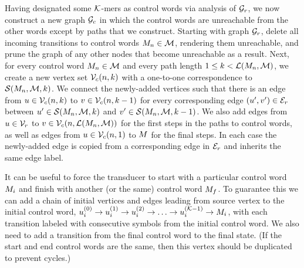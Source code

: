 \documentclass[english]{article}
\begin{document}
Having designated some ${\cal K}$-mers as control words via analysis of ${\cal G}_r$,
we now construct a new graph ${\cal G}_c$
in which the control words are unreachable from the other words
except by paths that we construct.
Starting with graph ${\cal G}_r$, delete all incoming transitions to control words $M_n \in {\cal M}$,
rendering them unreachable,
and prune the graph of any other nodes that become unreachable as a result.
Next, for every control word $M_n \in {\cal M}$
and every path length $1 \leq k < {\cal L}(M_n,{\cal M})$,
we create a new vertex set ${\cal V}_c(n,k)$
with a one-to-one correspondence to ${\cal S}(M_n,{\cal M},k)$.
We connect the newly-added vertices such that there is an edge from
$u \in {\cal V}_c(n,k)$ to $v \in {\cal V}_c(n,k-1)$
for every corresponding edge $(u',v') \in {\cal E}_r$ between
$u' \in {\cal S}(M_n,{\cal M},k)$
and
$v' \in {\cal S}(M_n,{\cal M},k-1)$.
We also add edges from
$u \in {\cal V}_r$ to $v \in {\cal V}_c(n,{\cal L}(M_n,{\cal M}))$
for the first steps in the paths to control words,
as well as edges from
$u \in {\cal V}_c(n,1)$ to $M$
for the final steps.
In each case the newly-added edge is copied from a corresponding edge in ${\cal E}_r$
and inherits the same edge label.

It can be useful to force the transducer to start with a particular control word $M_i$
and finish with another (or the same) control word $M_f$.
To guarantee this we can add a chain of initial vertices and edges leading from source vertex to the initial control word,
$u^{(0)}_i \to u^{(1)}_i \to u^{(2)}_i \to \ldots \to u^{({\cal K}-1)}_i \to M_i$,
with each transition labeled with consecutive symbols from the initial control word.
We also need to add a transition from the final control word to the final state.
(If the start and end control words are the same, then this vertex should be duplicated to prevent cycles.)
\end{document}
